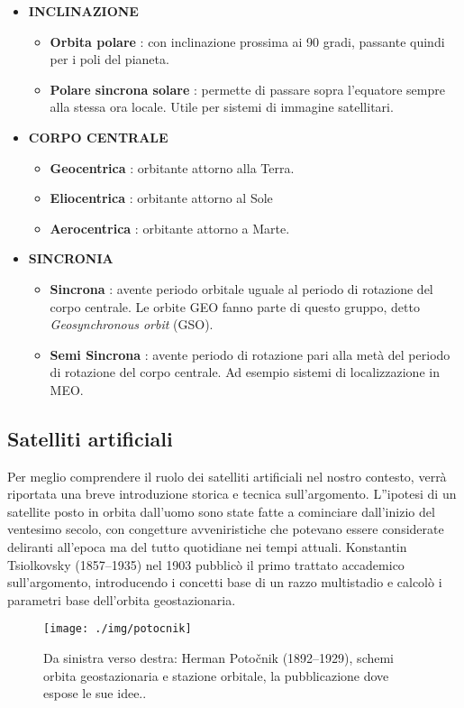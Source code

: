 \documentclass[12pt,a4paper,oneside]{book}
\begin{document}
\begin{itemize}
				\item{\bf INCLINAZIONE}	
					\begin{itemize}
						\item \textbf{Orbita polare} : con inclinazione prossima ai 90 gradi, passante quindi per i poli del pianeta.
						\item \textbf{Polare sincrona solare} : permette di passare sopra l'equatore sempre alla stessa ora locale. Utile per sistemi di immagine satellitari.
					\end{itemize}
					
				\item{\bf CORPO CENTRALE}	
					\begin{itemize}
						\item \textbf{Geocentrica} : orbitante attorno alla Terra.
						\item \textbf{Eliocentrica} : orbitante attorno al Sole
						\item \textbf{Aerocentrica} : orbitante attorno a Marte.
					\end{itemize}
				
				
				\item{\bf SINCRONIA}	
					\begin{itemize}
						\item \textbf{Sincrona} : avente periodo orbitale uguale al periodo di rotazione del corpo centrale. Le orbite GEO fanno parte di questo gruppo, detto \textit{Geosynchronous orbit} (GSO).
						\item \textbf{Semi Sincrona} : avente periodo di rotazione pari alla metà del periodo di rotazione del corpo centrale. Ad esempio sistemi di localizzazione in MEO.
					\end{itemize}
			\end{itemize}								
						
			\subsection{Satelliti artificiali}
			Per meglio comprendere il ruolo dei satelliti artificiali nel nostro contesto, verrà riportata una breve introduzione storica e tecnica sull'argomento. L''ipotesi di un satellite posto in orbita dall'uomo sono state fatte a cominciare dall'inizio del ventesimo secolo, con congetture avveniristiche che potevano essere considerate deliranti all'epoca ma del tutto quotidiane nei tempi attuali. Konstantin Tsiolkovsky (1857–1935) nel 1903 pubblicò il primo trattato accademico sull'argomento, introducendo i concetti base di un razzo multistadio e calcolò i parametri base dell'orbita geostazionaria. 
			\begin{figure}[h]
				\centering
				\texttt{[image: ./img/potocnik]}
				\caption{Da sinistra verso destra: Herman Potočnik (1892–1929), schemi orbita geostazionaria e stazione orbitale, la pubblicazione dove espose le sue idee..}
				\label{fig:poto}
			\end{figure}			
			
\end{document}
